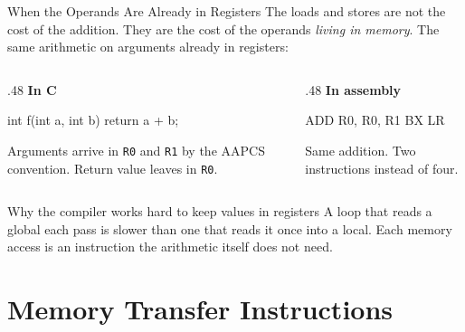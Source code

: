 \documentclass[9pt,aspectratio=169,xcolor=table]{beamer}
\begin{document}
\begin{frame}[fragile]{When the Operands Are Already in Registers}
    \leavevmode
    {\small The loads and stores are not the cost of the addition. They are
    the cost of the operands \emph{living in memory}. The same arithmetic
    on arguments already in registers:}

    \vspace{2mm}
    \begin{columns}[T]
    \begin{column}{.48\textwidth}
        \textbf{In C}

        \vspace{1mm}
        \begin{cc}
int f(int a, int b) {
    return a + b;
}
        \end{cc}

        \vspace{2mm}
        {\footnotesize Arguments arrive in \texttt{R0} and \texttt{R1} by
        the AAPCS convention. Return value leaves in \texttt{R0}.}
    \end{column}
    \begin{column}{.48\textwidth}
        \textbf{In assembly}

        \vspace{1mm}
        \begin{asm}[basicstyle=\normalsize\ttfamily]
	ADD   R0, R0, R1
	BX    LR
        \end{asm}

        \vspace{3mm}
        {\small Same addition. \alert{Two instructions} instead of four.}
    \end{column}
    \end{columns}

    \vspace{3mm}
    \begin{block}{Why the compiler works hard to keep values in registers}
        A loop that reads a global each pass is slower than one that reads
        it once into a local. Each memory access is an instruction the
        arithmetic itself does not need.
    \end{block}
\end{frame}


\section{Memory Transfer Instructions}
\end{document}
